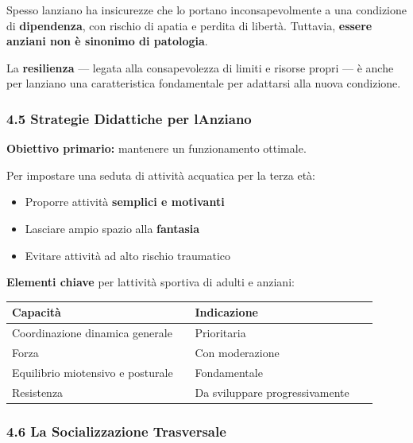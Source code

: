 \documentclass[a4paper,11pt]{article}
\providecommand{\tightlist}{%
  \setlength{\itemsep}{0pt}\setlength{\parskip}{0pt}}
\begin{document}
Spesso l\textquotesingle anziano ha insicurezze che lo portano
inconsapevolmente a una condizione di \textbf{dipendenza}, con rischio
di apatia e perdita di libertà. Tuttavia, \textbf{essere anziani non è
      sinonimo di patologia}.

La \textbf{resilienza} --- legata alla consapevolezza di limiti e
risorse propri --- è anche per l\textquotesingle anziano una
caratteristica fondamentale per adattarsi alla nuova condizione.

\subsubsection{4.5 Strategie Didattiche per
      l\textquotesingle Anziano}\label{strategie-didattiche-per-lanziano}

\textbf{Obiettivo primario:} mantenere un funzionamento ottimale.

Per impostare una seduta di attività acquatica per la terza età:

\begin{itemize}
      \tightlist
      \item
            Proporre attività \textbf{semplici e motivanti}
      \item
            Lasciare ampio spazio alla \textbf{fantasia}
      \item
            Evitare attività ad alto rischio traumatico
\end{itemize}

\textbf{Elementi chiave} per l\textquotesingle attività sportiva di
adulti e anziani:

\begin{longtable}[]{@{}p{0.47\linewidth}p{0.47\linewidth}@{}}
      \toprule\noalign{}
      Capacità                          & Indicazione                    \\
      \midrule\noalign{}
      \endhead
      \bottomrule\noalign{}
      \endlastfoot
      Coordinazione dinamica generale   & Prioritaria                    \\
      Forza                             & Con moderazione                \\
      Equilibrio miotensivo e posturale & Fondamentale                   \\
      Resistenza                        & Da sviluppare progressivamente \\
\end{longtable}

\subsubsection{4.6 La Socializzazione
      Trasversale}\label{la-socializzazione-trasversale}
\end{document}

